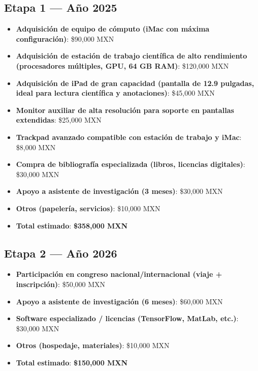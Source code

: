 \documentclass[12pt]{article}
\begin{document}
\subsection*{Etapa 1 — Año 2025}
\begin{itemize}
  \item \textbf{Adquisición de equipo de cómputo (iMac con máxima configuración)}: \$90,000 MXN
  \item \textbf{Adquisición de estación de trabajo científica de alto rendimiento (procesadores múltiples, GPU, 64 GB RAM)}: \$120,000 MXN
  \item \textbf{Adquisición de iPad de gran capacidad (pantalla de 12.9 pulgadas, ideal para lectura científica y anotaciones)}: \$45,000 MXN
  \item \textbf{Monitor auxiliar de alta resolución para soporte en pantallas extendidas}: \$25,000 MXN
  \item \textbf{Trackpad avanzado compatible con estación de trabajo y iMac}: \$8,000 MXN
  \item \textbf{Compra de bibliografía especializada (libros, licencias digitales)}: \$30,000 MXN
  \item \textbf{Apoyo a asistente de investigación (3 meses)}: \$30,000 MXN
  \item \textbf{Otros (papelería, servicios)}: \$10,000 MXN
  \item \textbf{Total estimado}: \textbf{\$358,000 MXN}
\end{itemize}

\subsection*{Etapa 2 — Año 2026}
\begin{itemize}
  \item \textbf{Participación en congreso nacional/internacional (viaje + inscripción)}: \$50,000 MXN
  \item \textbf{Apoyo a asistente de investigación (6 meses)}: \$60,000 MXN
  \item \textbf{Software especializado / licencias (TensorFlow, MatLab, etc.)}: \$30,000 MXN
  \item \textbf{Otros (hospedaje, materiales)}: \$10,000 MXN
  \item \textbf{Total estimado}: \textbf{\$150,000 MXN}
\end{itemize}
\end{document}
